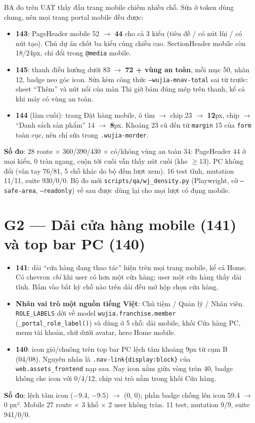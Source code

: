 BA đo trên UAT thấy đầu trang mobile chiếm nhiều chỗ. Sửa ở token dùng chung, nên mọi trang portal mobile đều được:
\begin{itemize}[nosep]
\item \textbf{143}: PageHeader mobile 52 $\to$ \textbf{44} cho cả 3 kiểu (tiêu đề / có nút lùi / có nút tạo). Chủ dự án chốt
  ba kiểu cùng chiều cao. SectionHeader mobile còn 18/24px, chỉ đổi trong \texttt{@media} mobile.
\item \textbf{145}: thanh điều hướng dưới 83 $\to$ \textbf{72 + vùng an toàn}, mỗi mục 50, nhãn 12, badge neo góc icon.
  Sửa kèm công thức \texttt{--wujia-mnav-total} sai từ trước: sheet ``Thêm'' và nút nổi của màn Thi giờ bám đúng mép
  trên thanh, kể cả khi máy có vùng an toàn.
\item \textbf{144} (làm cuối): trang Đặt hàng mobile, ô tìm $\to$ chip 23 $\to$ \textbf{12}px, chip $\to$ ``Danh sách sản phẩm''
  14 $\to$ \textbf{8}px. Khoảng 23 cũ đến từ \texttt{margin} 15 của \texttt{form} toàn cục, nên chỉ sửa trong
  \texttt{.wujia-morder}.
\end{itemize}
\textbf{Số đo}: 28 route $\times$ 360/390/430 $\times$ có/không vùng an toàn 34: PageHeader 44 ở mọi kiểu, 0 tràn ngang,
cuộn tới cuối vẫn thấy nút cuối (khe $\geq$13). PC không đổi (vân tay 76/81, 5 chỗ khác do bộ đếm lượt xem). 16 test tĩnh,
mutation 11/11, suite 930/0/0. Bộ đo mới \texttt{scripts/qa/wj\_density.py} (Playwright, cờ \texttt{--safe-area},
\texttt{--readonly}) về sau được dùng lại cho mọi lượt có đụng mobile.

\section{G2 --- Dải cửa hàng mobile (141) và top bar PC (140)}

\begin{itemize}[nosep]
\item \textbf{141}: dải ``cửa hàng đang thao tác'' hiện trên mọi trang mobile, kể cả Home. Có chevron \emph{chỉ} khi user
  có hơn một cửa hàng; user một cửa hàng thấy dải tĩnh. Bấm vào bất kỳ chỗ nào trên dải đều mở hộp chọn cửa hàng.
\item \textbf{Nhãn vai trò một nguồn tiếng Việt}: Chủ tiệm / Quản lý / Nhân viên. \texttt{ROLE\_LABELS} dời về model
  \texttt{wujia.franchise.member} (\texttt{\_portal\_role\_label()}) và dùng ở 5 chỗ: dải mobile, khối Cửa hàng PC,
  menu tài khoản, chữ dưới avatar, hero Home mobile.
\item \textbf{140}: icon giỏ/chuông trên top bar PC lệch tâm khoảng 9px từ cụm B (04/08). Nguyên nhân là
  \texttt{.nav-link\{display:block\}} của \texttt{web.assets\_frontend} nạp sau. Nay icon nằm giữa vòng tròn 40, badge
  không che icon với 0/4/12, chip vai trò nằm trong khối Cửa hàng.
\end{itemize}
\textbf{Số đo}: lệch tâm icon ($-$9.4, $-$9.5) $\to$ (0, 0); phần badge chồng lên icon 59.4 $\to$ 0 px². Mobile 27 route
$\times$ 3 khổ $\times$ 2 user không tràn. 11 test, mutation 9/9, suite 941/0/0.

